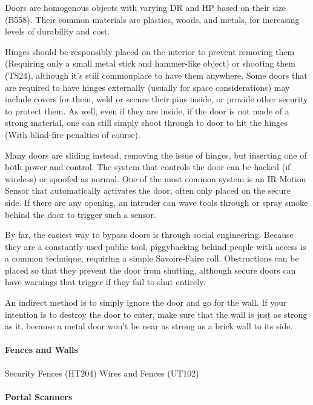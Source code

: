 \begin{multicols*}{2}
	Doors are homogenous objects with varying DR and HP based on their size (B558). Their common materials are plastics, woods, and metals, for increasing levels of durability and cost. 
	
	Hinges should be responsibly placed on the interior to prevent removing them (Requiring only a small metal stick and hammer-like object) or shooting them (TS24), although it's still commonplace to have them anywhere. Some doors that are required to have hinges externally (usually for space considerations) may include covers for them, weld or secure their pins inside, or provide other security to protect them. As well, even if they are inside, if the door is not made of a strong material, one can still simply shoot through to door to hit the hinges (With blind-fire penalties of course).
	
	Many doors are sliding instead, removing the issue of hinges, but inserting one of both power and control. The system that controls the door can be hacked (if wireless) or spoofed as normal. One of the most common system is an IR Motion Sensor that automatically activates the door, often only placed on the secure side. If there are any opening, an intruder can wave tools through or spray smoke behind the door to trigger such a sensor. 
	
	By far, the easiest way to bypass doors is through social engineering. Because they are a constantly used public tool, piggybacking behind people with access is a common technique, requiring a simple Savoire-Faire roll. Obstructions can be placed so that they prevent the door from shutting, although secure doors can have warnings that trigger if they fail to shut entirely.
	
	An indirect method is to simply ignore the door and go for the wall. If your intention is to destroy the door to enter, make sure that the wall is just as strong as it, because a metal door won't be near as strong as a brick wall to its side.
	
	\paragraph{Fences and Walls}
	
	Security Fences (HT204)
	Wires and Fences (UT102)
	
	\paragraph{Portal Scanners}
	

\end{multicols*}
